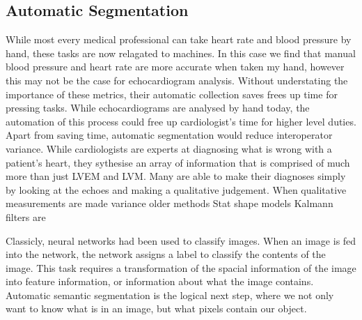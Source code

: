 \documentclass[12pt]{article}
\begin{document}
\subsection{Automatic Segmentation}
While most every medical professional can take heart rate and blood pressure by hand, these tasks are now relagated to machines.\cite{pulse oxymmetry bp cuffs}
In this case we find that manual blood pressure and heart rate are more accurate when taken my hand, however this may not be the case for echocardiogram analysis.
Without understating the importance of these metrics, their automatic collection saves frees up time for pressing tasks.
While echocardiograms are analysed by hand today, the automation of this process could free up cardiologist's time for higher level duties.
Apart from saving time, automatic segmentation would reduce interoperator variance.
While cardiologists are experts at diagnosing what is wrong with a patient's heart, they sythesise an array of information that is comprised of much more than just LVEM and LVM.
Many are able to make their diagnoses simply by looking at the echoes and making a qualitative judgement.
When qualitative measurements are made
variance
older methods
Stat shape models
Kalmann filters are

Classicly, neural networks had been used to classify images.
When an image is fed into the network, the network assigns a label to classify the contents of the image.
This task requires a transformation of the spacial information of the image into feature information, or information about what the image contains. 
Automatic semantic segmentation is the logical next step, where we not only want to know what is in an image, but what pixels contain our object.
\end{document}
